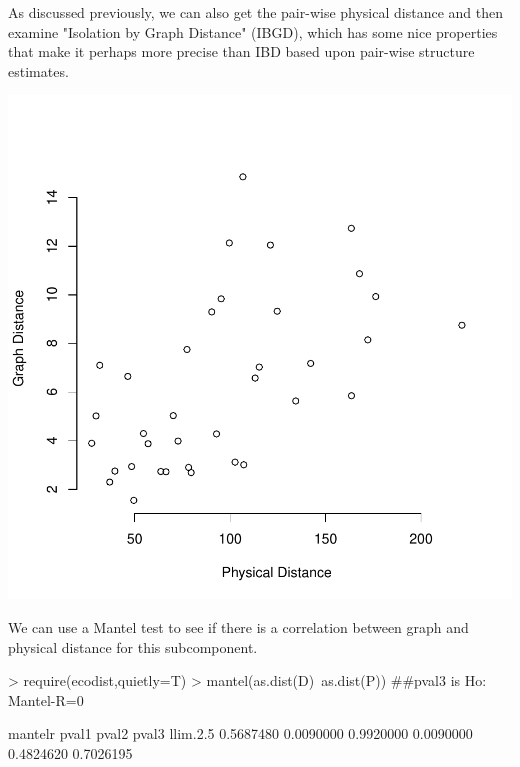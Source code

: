 \documentclass[letterpaper,twoside,openany]{book}
\begin{document}
As discussed previously, we can also get the pair-wise physical distance and then examine "Isolation by Graph Distance" (IBGD), which has some nice properties that make it perhaps more precise than IBD based upon pair-wise structure estimates.

\begin{Schunk}
\end{Schunk}
\includegraphics{gstudio-070}


We can use a Mantel test to see if there is a correlation between graph and physical distance for this subcomponent.

\begin{Schunk}
\begin{Sinput}
> require(ecodist,quietly=T)
> mantel(as.dist(D)~as.dist(P)) ##pval3 is Ho: Mantel-R=0
\end{Sinput}
\begin{Soutput}
   mantelr      pval1      pval2      pval3  llim.2.5%
 0.5687480  0.0090000  0.9920000  0.0090000  0.4824620  0.7026195 
\end{Soutput}
\end{Schunk}
\end{document}
